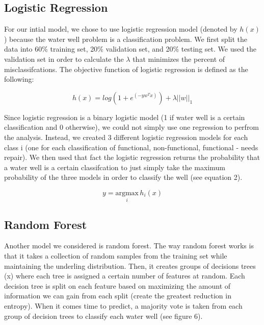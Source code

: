 \documentclass[10pt]{SelfArx} %
\begin{document}
\subsection{Logistic Regression}

For our intial model, we chose to use logistic regression model (denoted by $h(x)$) because the water well problem is a classification problem. We first split the data into 60\% training set, 20\% validation set, and 20\% testing set. We used the validation set in order to calculate the $\lambda$ that minimizes the percent of misclassifcations. The objective function of logistic regression is defined as the following: 

\begin{equation}
 h(x) = log(1+e^{(-yw^Tx)}) + \lambda||w||_1
\end{equation}

Since logistic regression is a binary logistic model (1 if water well is a certain classification and 0 otherwise), we could not simply use one regression to perfrom the analysis. Instead, we created 3 different logistic regression models for each class i (one for each classification of functional, non-functional, functional - needs repair). We then used that fact the logistic regression returns the probability that a water well is a certain classifcation to just simply take the maximum probability of the three models in order to classify the well (see equation 2).

\begin{equation}
 y= \underset{i}{\mathrm{argmax}}\, h_i(x) 
\end{equation}

\subsection{Random Forest}

Another model we considered is random forest. The way random forest works is that it takes a collection of random samples from the training set while maintaining the underling distribution. Then, it creates groups of decisions trees (x) where each tree is assigned a certain number of features at random. Each decision tree is split on each feature based on maximizing the amount of information we can gain from each split (create the greatest reduction in entropy). When it comes time to predict, a majority vote is taken from each group of decision trees to classify each water well (see figure 6).  
\\[-1.5\baselineskip]
\break
\end{document}
